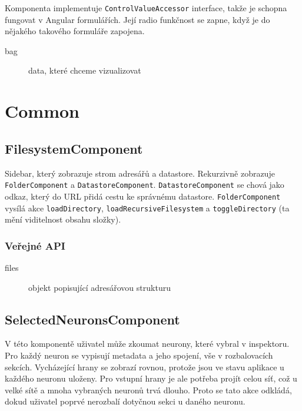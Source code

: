 Komponenta implementuje \lstinline|ControlValueAccessor| interface, takže je schopna fungovat v Angular formulářích. Její radio funkčnost se zapne, když je do nějakého takového formuláře zapojena.

\begin{description}
  \item[bag] data, které chceme vizualizovat
\end{description}

\section{Common}

\subsection{FilesystemComponent}

Sidebar, který zobrazuje strom adresářů a datastore. Rekurzivně zobrazuje \lstinline|FolderComponent| a \lstinline|DatastoreComponent|. \lstinline|DatastoreComponent| se chová jako odkaz, který do URL přidá cestu ke správnému datastore. \lstinline|FolderComponent| vysílá akce \lstinline|loadDirectory|, \lstinline|loadRecursiveFilesystem| a \lstinline|toggleDirectory| (ta mění viditelnost obsahu složky).

\subsubsection*{Veřejné API}

\begin{description}
  \item[files] objekt popisující adresářovou strukturu
\end{description}

\subsection{SelectedNeuronsComponent}

V této komponentě uživatel může zkoumat neurony, které vybral v inspektoru. Pro každý neuron se vypisují metadata a jeho spojení, vše v rozbalovacích sekcích. Vycházející hrany se zobrazí rovnou, protože jsou ve stavu aplikace u každého neuronu uloženy. Pro vstupní hrany je ale potřeba projít celou síť, což u velké sítě a mnoha vybraných neuronů trvá dlouho. Proto se tato akce odkládá, dokud uživatel poprvé nerozbalí dotyčnou sekci u daného neuronu.

